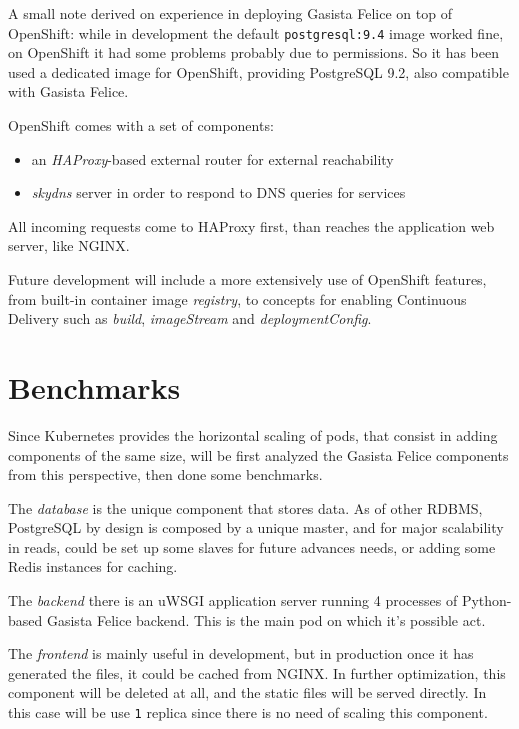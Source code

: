 A small note derived on experience in deploying Gasista Felice on top of OpenShift:  while in development the default \texttt{postgresql:9.4} image worked fine, on OpenShift it had some problems probably due to permissions. So it has been used a dedicated image for OpenShift, providing PostgreSQL 9.2, also compatible with Gasista Felice.

OpenShift comes with a set of components:

\begin{itemize}
\item an \textit{HAProxy}-based external router for external reachability
\item \textit{skydns} server in order to respond to DNS queries for services
\end{itemize}

All incoming requests come to HAProxy first, than reaches the application web server, like NGINX.

Future development will include a more extensively use of OpenShift features, from built-in container image \textit{registry}, to concepts for enabling Continuous Delivery such as \textit{build}, \textit{imageStream} and \textit{deploymentConfig}.

\section{Benchmarks}\label{benchmarks}

Since Kubernetes provides the horizontal scaling of pods, that consist in adding components of the same size, will be first analyzed the Gasista Felice components from this perspective, then done some benchmarks.

The \textit{database} is the unique component that stores data.  As of other RDBMS, PostgreSQL by design is composed by a unique master, and for major scalability in reads, could be set up some slaves for future advances needs, or adding some Redis instances for caching.

The \textit{backend} there is an uWSGI application server running 4 processes of Python-based Gasista Felice backend.  This is the main pod on which it's possible act.

The \textit{frontend} is mainly useful in development, but in production once it has generated the files, it could be cached from NGINX. In further optimization, this component will be deleted at all, and the static files will be served directly. In this case will be use \texttt{1} replica since there is no need of scaling this component.

